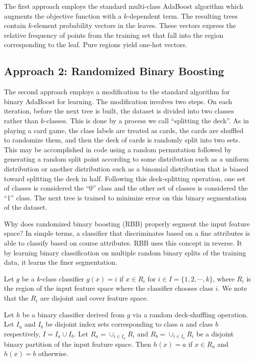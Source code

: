 \documentclass{article}
\begin{document}
The first approach employs the standard multi-class AdaBoost algorithm which augments the objective function with a $k$-dependent term.  The resulting trees contain $k$-element probability vectors in the leaves.  These vectors express the relative frequency of points from the training set that fall into the region corresponding to the leaf.  Pure regions yield one-hot vectors.

\subsection{Approach 2: Randomized Binary Boosting}

The second approach employs a modification to the standard algorithm for binary AdaBoost for learning.  The modification involves two steps.  On each iteration, before the next tree is built, the dataset is divided into two classes rather than $k$-classes.  This is done by a process we call ``splitting the deck''.  As in playing a card game, the class labels are treated as cards, the cards are shuffled to randomize them, and then the deck of cards is randomly split into two sets.  This may be accomplished in code using a random permutation followed by generating a random split point according to some distribution such as a uniform distribution or another distribution such as a binomial distribution that is biased toward splitting the deck in half.  Following this deck-splitting operation, one set of classes is considered the ``0'' class and the other set of classes is considered the ``1'' class.  The next tree is trained to minimize error on this binary segmentation of the dataset.

Why does randomized binary boosting (RBB) properly segment the input feature space?  In simple terms, a classifier that discriminates based on a fine attributes is able to classify based on course attributes.  RBB uses this concept in reverse.  It by learning binary classification on multiple random binary splits of the training data, it learns the finer segmentation.


Let $g$ be a $k$-class classifier $g(x) = i$ if $x \in R_i$ for $i \in I = \{1, 2, \cdots, k\}$, where $R_i$ is the region of the input feature space where the classifier chooses class $i$.  We note that the $R_i$ are disjoint and cover feature space.

Let $h$ be a binary classifier derived from $g$ via a random deck-shuffling operation.  Let $I_a$ and $I_b$ be disjoint index sets corresponding to class $a$ and class $b$ respectively, $I=I_a \cup I_b$.  Let $R_a = \cup_{i \in I_a} R_i$ and $R_b = \cup_{i \in I_b} R_i$ be a disjoint binary partition of the input feature space.  Then $h(x) = a$ if $x \in R_a$ and $h(x) = b$ otherwise.
\end{document}
